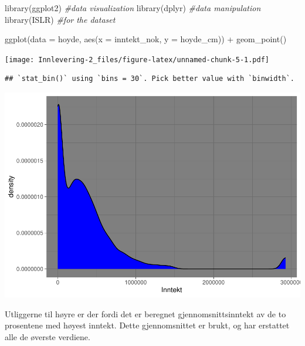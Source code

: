 \documentclass[
  12pt,
  norsk,
]{article}
\newenvironment{Shaded}{\begin{snugshade}}{\end{snugshade}}
\newcommand{\AttributeTok}[1]{\textcolor[rgb]{0.77,0.63,0.00}{#1}}
\newcommand{\CommentTok}[1]{\textcolor[rgb]{0.56,0.35,0.01}{\textit{#1}}}
\newcommand{\FunctionTok}[1]{\textcolor[rgb]{0.00,0.00,0.00}{#1}}
\newcommand{\NormalTok}[1]{#1}
\newcommand{\SpecialCharTok}[1]{\textcolor[rgb]{0.00,0.00,0.00}{#1}}
\newcommand{\StringTok}[1]{\textcolor[rgb]{0.31,0.60,0.02}{#1}}
\begin{document}
\begin{Shaded}
\begin{Highlighting}[]
\FunctionTok{library}\NormalTok{(ggplot2) }\CommentTok{\#data visualization}
\FunctionTok{library}\NormalTok{(dplyr) }\CommentTok{\#data manipulation}
\FunctionTok{library}\NormalTok{(ISLR) }\CommentTok{\#for the dataset}

\FunctionTok{ggplot}\NormalTok{(}\AttributeTok{data =}\NormalTok{ hoyde, }\FunctionTok{aes}\NormalTok{(}\AttributeTok{x =}\NormalTok{ inntekt\_nok, }\AttributeTok{y =}\NormalTok{ hoyde\_cm)) }\SpecialCharTok{+} \FunctionTok{geom\_point}\NormalTok{()}
\end{Highlighting}
\end{Shaded}

\texttt{[image: Innlevering-2\_files/figure-latex/unnamed-chunk-5-1.pdf]}

\begin{Shaded}
\end{Shaded}

\begin{verbatim}
## `stat_bin()` using `bins = 30`. Pick better value with `binwidth`.
\end{verbatim}

\includegraphics{Innlevering-2_files/figure-latex/unnamed-chunk-6-1.pdf}

Utliggerne til høyre er der fordi det er beregnet gjennomsnittsinntekt
av de to prosentene med høyest inntekt. Dette gjennomsnittet er brukt,
og har erstattet alle de øverste verdiene.
\end{document}
